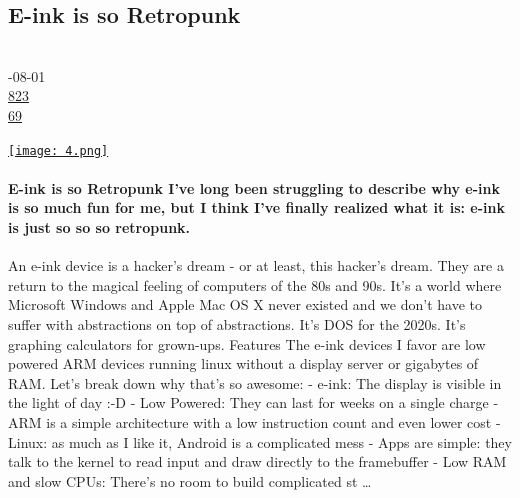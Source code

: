 \documentclass[10pt,a4paper]{article}
\begin{document}
\subsection{E-ink is so Retropunk}
\noindent\begin{minipage}[t]{0.19\linewidth}
\vspace{0pt}
\noindent\scshape\footnotesize
\\ {\scriptsize\faCalendar}-08-01
\\ {\scriptsize\faThumbsOUp}\space 
\href{http://news.ycombinator.com/item?id=37272652\&utm\_term=comment}{823} 
\\ {\scriptsize\faComments}\space 
\href{http://news.ycombinator.com/item?id=37272652\&utm\_term=comment}{69} 
\end{minipage} 
\begin{minipage}[t]{0.80\linewidth}
\vspace{0pt}
\begin{multicols}{2}
    \href{https://rmkit.dev/eink-is-so-retropunk/?utm\_source=hackernewsletter\&utm\_medium=email\&utm\_term=fav}{
        \texttt{[image: 4.png]}
    }
\paragraph{E-ink is so Retropunk
I’ve long been struggling to describe why e-ink is so much fun for me, but I think I’ve finally realized what it is: e-ink is just so so so retropunk.}

An e-ink device is a hacker’s dream - or at least, this hacker’s dream. They
are a return to the magical feeling of computers of the 80s and 90s. It’s a
world where
Microsoft Windows and Apple Mac OS X never existed and we
don’t have to suffer with abstractions on top of abstractions. It’s DOS for
the 2020s. It’s graphing calculators for grown-ups.
Features
The e-ink devices I favor are low powered ARM devices running linux without a display server or gigabytes of RAM. Let’s break down why that’s so awesome:
- e-ink: The display is visible in the light of day :-D
- Low Powered: They can last for weeks on a single charge
- ARM is a simple architecture with a low instruction count and even lower cost
- Linux: as much as I like it, Android is a complicated mess
- Apps are simple: they talk to the kernel to read input and draw directly to the framebuffer
- Low RAM and slow CPUs: There’s no room to build complicated st
\dots
\end{multicols}
\end{minipage}
\par\medskip
\end{document}
